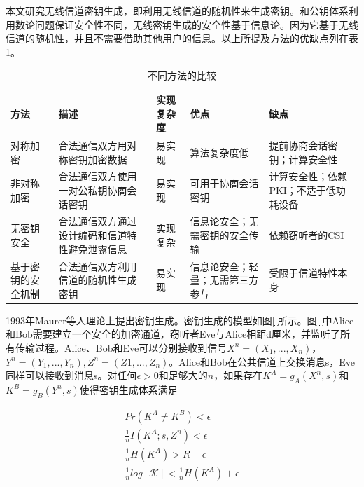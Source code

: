 \documentclass[master]{seuthesis} %
\begin{document}
\begin{Main}
本文研究无线信道密钥生成，即利用无线信道的随机性来生成密钥。和公钥体系利用数论问题保证安全性不同，无线密钥生成的安全性基于信息论。因为它基于无线信道的随机性\cite{ahlswede1993common}\cite{maurer1993secret}，并且不需要借助其他用户的信息。以上所提及方法的优缺点列在表\ref{comparison-different-schemes}。

\begin{table}[]
    \centering
    \begin{tabular}{|p{80pt}|p{90pt}|p{70pt}|p{90pt}|p{90pt}|}
    \hline
    方法 & 描述 & 实现复杂度 & 优点 & 缺点 \\ \hline
    对称加密 & 合法通信双方用对称密钥加密数据 & 易实现 & 算法复杂度低 & 提前协商会话密钥；计算安全性 \\ \hline
    非对称加密 & 合法通信双方使用一对公私钥协商会话密钥 & 易实现 & 可用于协商会话密钥 & 计算安全性；依赖PKI；不适于低功耗设备 \\ \hline
    无密钥安全 & 合法通信双方通过设计编码和信道特性避免泄露信息 & 实现复杂 & 信息论安全；无需密钥的安全传输 & 依赖窃听者的CSI \\ \hline
    基于密钥的安全机制 & 合法通信双方利用信道的随机性生成密钥 & 易实现 & 信息论安全；轻量；无需第三方参与 & 受限于信道特性本身 \\ \hline
    \end{tabular}

    \caption{不同方法的比较
    \label{comparison-different-schemes}}
\end{table}

1993年Maurer等人理论上提出密钥生成\cite{ahlswede1993common}\cite{maurer1993secret}。密钥生成的模型如图\ref{}所示。图\ref{}中Alice和Bob需要建立一个安全的加密通道，窃听者Eve与Alice相距d厘米，并监听了所有传输过程。Alice、Bob和Eve可以分别接收到信号$X^n = (X_1, ..., X_n)$，$Y^n = (Y_1, ..., Y_n), Z^n = (Z1, ..., Z_n)$。Alice和Bob在公共信道上交换消息s，Eve同样可以接收到消息s。对任何$\epsilon > 0$和足够大的$n$，如果存在$K^A = g_A(X^n, s)$和$K^B = g_B(Y^n, s)$使得密钥生成体系满足

\begin{eqnarray}
    Pr(K^A \neq K^B) < \epsilon \label{keyrate1} \\
    \frac{1}{n}I(K^A; s, Z^n) < \epsilon \label{keyrate2} \\
    \frac{1}{n}H(K^A) > R - \epsilon \label{keyrate3} \\
    \frac{1}{n}log[\mathcal{K}] < \frac{1}{n}H(K^A) + \epsilon \label{keyrate4}
\end{eqnarray}


\end{Main}
\end{document}
